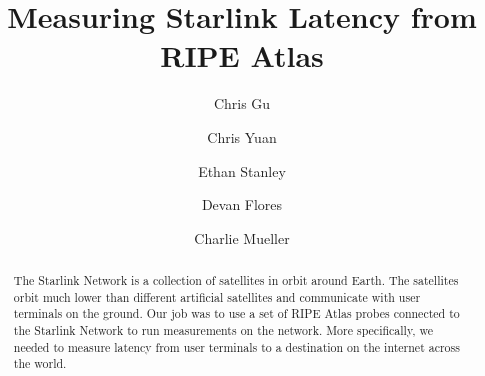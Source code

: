 \documentclass[acmsmall]{acmart}
\begin{document}
\title{Measuring Starlink Latency from RIPE Atlas}

\author{Chris Gu}

\author{Chris Yuan}


\author{Ethan Stanley}


\author{Devan Flores}


\author{Charlie Mueller}







\begin{abstract}
The Starlink Network is a collection of satellites in orbit around Earth. The satellites orbit much lower than different artificial satellites and communicate with user terminals on the ground. Our job was to use a set of RIPE Atlas probes connected to the Starlink Network to run measurements on the network. More specifically, we needed to measure latency from user terminals to a destination on the internet across the world.
\end{abstract}





\maketitle
\end{document}
